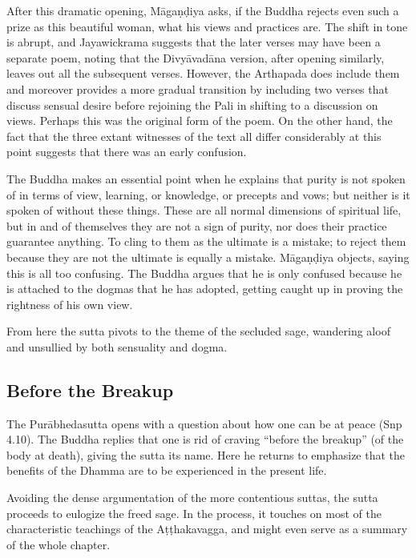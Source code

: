 \documentclass[12pt,openany]{book}%
\begin{document}
After this dramatic opening, \textsanskrit{Māgaṇḍiya} asks, if the Buddha rejects even such a prize as this beautiful woman, what his views and practices are. The shift in tone is abrupt, and Jayawickrama suggests that the later verses may have been a separate poem, noting that the \textsanskrit{Divyāvadāna} version, after opening similarly, leaves out all the subsequent verses. However, the Arthapada does include them and moreover provides a more gradual transition by including two verses that discuss sensual desire before rejoining the Pali in shifting to a discussion on views. Perhaps this was the original form of the poem. On the other hand, the fact that the three extant witnesses of the text all differ considerably at this point suggests that there was an early confusion.

The Buddha makes an essential point when he explains that purity is not spoken of in terms of view, learning, or knowledge, or precepts and vows; but neither is it spoken of without these things. These are all normal dimensions of spiritual life, but in and of themselves they are not a sign of purity, nor does their practice guarantee anything. To cling to them as the ultimate is a mistake; to reject them because they are not the ultimate is equally a mistake. \textsanskrit{Māgaṇḍiya} objects, saying this is all too confusing. The Buddha argues that he is only confused because he is attached to the dogmas that he has adopted, getting caught up in proving the rightness of his own view.

From here the sutta pivots to the theme of the secluded sage, wandering aloof and unsullied by both sensuality and dogma.

\subsection*{Before the Breakup}

The \textsanskrit{Purābhedasutta} opens with a question about how one can be at peace (Snp 4.10). The Buddha replies that one is rid of craving “before the breakup” (of the body at death), giving the sutta its name. Here he returns to emphasize that the benefits of the Dhamma are to be experienced in the present life.

Avoiding the dense argumentation of the more contentious suttas, the sutta proceeds to eulogize the freed sage. In the process, it touches on most of the characteristic teachings of the \textsanskrit{Aṭṭhakavagga}, and might even serve as a summary of the whole chapter.
\end{document}
